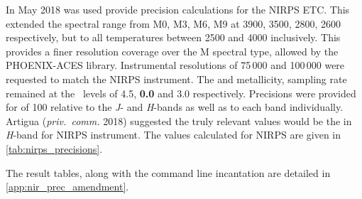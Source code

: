 In May 2018 \eniric{} was used provide precision calculations for the {NIRPS} {ETC}.
This extended the spectral range from {M0}, {M3}, {M6}, {M9} at 3900, 3500, 2800, 2600\K{} respectively, but to all temperatures between 2500\K{} and 4000\K{} inclusively.
This provides a finer resolution coverage over the M spectral type, allowed by the {PHOENIX-ACES} library.
Instrumental resolutions of 75\,000 and 100\,000 were requested to match the {NIRPS} instrument.
The \Logg{} and metallicity, sampling rate remained at the~\citet{figueira_radial_2016} levels of 4.5, \textbf{0.0} and 3.0 respectively.
Precisions were provided for \snr{} of 100 relative to the \emph{J}- and \emph{H}-bands as well as to each band individually.
Artigua (\emph{priv.\ comm.} 2018) suggested the truly relevant values would be the \snr{} in \emph{H}-band for {NIRPS} instrument.
The values calculated for {NIRPS} are given in \cref{tab:nirps_precisions}.

The result tables, along with the command line incantation are detailed in \cref{app:nir_prec_amendment}.

\clearpage